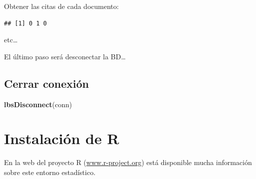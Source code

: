\documentclass[
]{book}
\newenvironment{Shaded}{\begin{snugshade}}{\end{snugshade}}
\newcommand{\ControlFlowTok}[1]{\textcolor[rgb]{0.13,0.29,0.53}{\textbf{#1}}}
\newcommand{\FunctionTok}[1]{\textcolor[rgb]{0.13,0.29,0.53}{\textbf{#1}}}
\newcommand{\NormalTok}[1]{#1}
\newcommand{\OtherTok}[1]{\textcolor[rgb]{0.56,0.35,0.01}{#1}}
\newcommand{\SpecialCharTok}[1]{\textcolor[rgb]{0.81,0.36,0.00}{\textbf{#1}}}
\begin{document}
Obtener las citas de cada documento:

\begin{Shaded}
\end{Shaded}

\begin{verbatim}
## [1] 0 1 0
\end{verbatim}

etc\ldots{}

El último paso será desconectar la BD\ldots{}

\hypertarget{cerrar-conexiuxf3n}{%
\section{Cerrar conexión}\label{cerrar-conexiuxf3n}}

\begin{Shaded}
\begin{Highlighting}[]
\FunctionTok{lbsDisconnect}\NormalTok{(conn)}
\end{Highlighting}
\end{Shaded}

\hypertarget{instalaciuxf3n-de-r}{%
\chapter{Instalación de R}\label{instalaciuxf3n-de-r}}

En la web del proyecto R
(\href{http://www.r-project.org}{www.r-project.org}) está disponible
mucha información sobre este entorno estadístico.
\end{document}
